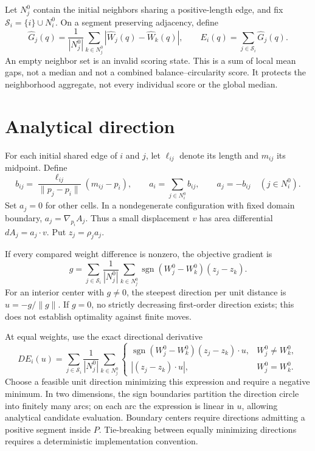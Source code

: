 \documentclass[11pt]{article}
\begin{document}
Let $N_j^0$ contain the initial neighbors sharing a positive-length edge,
and fix $\mathcal S_i=\{i\}\cup N_i^0$. On a segment preserving adjacency,
define
\[
 \widehat G_j(q)=\frac{1}{|N_j^0|}\sum_{k\in N_j^0}
 |\widehat W_j(q)-\widehat W_k(q)|,
 \qquad E_i(q)=\sum_{j\in\mathcal S_i}\widehat G_j(q).
\]
An empty neighbor set is an invalid scoring state. This is a sum of
local mean gaps, not a median and not a combined balance--circularity
score. It protects the neighborhood aggregate, not every individual
score or the global median.

\section{Analytical direction}
For each initial shared edge of $i$ and $j$, let $\ell_{ij}$ denote its
length and $m_{ij}$ its midpoint. Define
\[
 b_{ij}=\frac{\ell_{ij}}{\|p_j-p_i\|}(m_{ij}-p_i),\qquad
 a_i=\sum_{j\in N_i^0}b_{ij},\qquad
 a_j=-b_{ij}\quad(j\in N_i^0).
\]
Set $a_j=0$ for other cells. In a nondegenerate configuration with fixed
domain boundary, $a_j=\nabla_{p_i}A_j$. Thus a small displacement $v$
has area differential $dA_j=a_j\cdot v$. Put $z_j=\rho_j a_j$.

If every compared weight difference is nonzero, the objective gradient is
\[
 g=\sum_{j\in\mathcal S_i}\frac{1}{|N_j^0|}
 \sum_{k\in N_j^0}\operatorname{sgn}(W_j^0-W_k^0)(z_j-z_k).
\]
For an interior center with $g\ne0$, the steepest direction per unit
distance is $u=-g/\|g\|$. If $g=0$, no strictly decreasing first-order
direction exists; this does not establish optimality against finite moves.

At equal weights, use the exact directional derivative
\[
 D E_i(u)=\sum_{j\in\mathcal S_i}\frac{1}{|N_j^0|}
 \sum_{k\in N_j^0}
 \begin{cases}
 \operatorname{sgn}(W_j^0-W_k^0)(z_j-z_k)\cdot u,
       &W_j^0\ne W_k^0,\\
 |(z_j-z_k)\cdot u|,&W_j^0=W_k^0.
 \end{cases}
\]
Choose a feasible unit direction minimizing this expression and require
a negative minimum. In two dimensions, the sign boundaries partition
the direction circle into finitely many arcs; on each arc the expression
is linear in $u$, allowing analytical candidate evaluation. Boundary
centers require directions admitting a positive segment inside $P$.
Tie-breaking between equally minimizing directions requires a
deterministic implementation convention.
\end{document}
